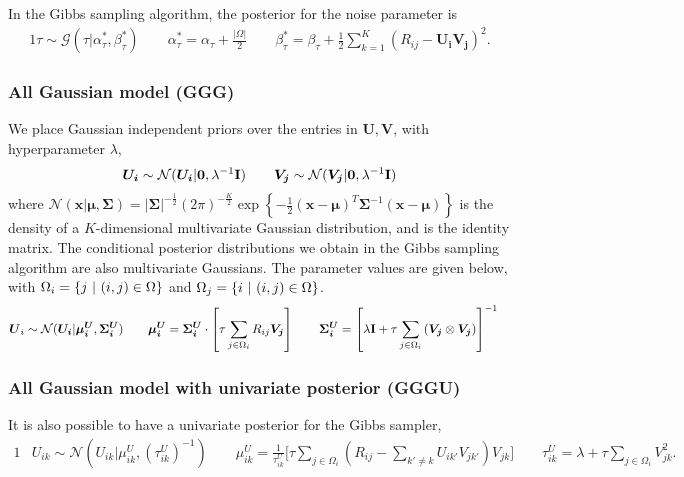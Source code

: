 \documentclass{article}
\newcommand{\U}{\boldsymbol U}
\newcommand{\Ui}{\boldsymbol{U_i}}
\newcommand{\V}{\boldsymbol V}
\newcommand{\Vj}{\boldsymbol{V_j}}
\newcommand{\SigmaUi}{\boldsymbol{\Sigma^U_i}}
\newcommand{\muUi}{\boldsymbol{\mu^U_i}}
\newcommand{\sumOmegai}{\sum_{j \in \Omega_i}}
\newcommand{\sumk}{\sum_{k=1}^K}
\newcommand{\sumexclk}{\sum_{k' \neq k}}
\newcommand{\diff}{( R_{ij} - \Ui \Vj ) }
\newcommand{\diffexclk}{( R_{ij} - \sumexclk U_{ik'} V_{jk'} ) }
\begin{document}
		In the Gibbs sampling algorithm, the posterior for the noise parameter is
		\begin{alignat*}{1}
			\tau \sim \mathcal{G} (\tau | \alpha^*_{\tau}, \beta^*_{\tau} )		\quad\quad 		\alpha^*_{\tau} = \alpha_{\tau} + \frac{\vert \Omega \vert}{2} 		\quad\quad  		\beta^*_{\tau} = \beta_{\tau} + \frac{1}{2} \sumk \diff^2.
		\end{alignat*}
		
		\subsubsection{All Gaussian model (GGG)}
		We place Gaussian independent priors over the entries in $\U,\V$, with hyperparameter $\lambda$,
		\begin{alignat*}{1}
			\Ui \sim \mathcal{N} ( \Ui | \boldsymbol 0, \lambda^{-1} \text{\textbf I} )		\quad\quad	\Vj \sim \mathcal{N} ( \Vj | \boldsymbol 0, \lambda^{-1} \text{\textbf I} )
		\end{alignat*}
		where $ \mathcal{N} (\boldsymbol x|\boldsymbol \mu,\boldsymbol \Sigma) = \vert \boldsymbol \Sigma \vert^{-\frac{1}{2}} (2\pi)^{-\frac{K}{2}} \exp \left\{ -\frac{1}{2} (\boldsymbol x - \boldsymbol \mu)^T \boldsymbol \Sigma^{-1} (\boldsymbol x - \boldsymbol \mu) \right\} $ is the density of a $K$-dimensional multivariate Gaussian distribution, and  is the identity matrix.
		The conditional posterior distributions we obtain in the Gibbs sampling algorithm are also multivariate Gaussians. The parameter values are given below, with $ \Omega_i = \left\{ j \text{ $ \vert $ } (i,j) \in \Omega \right\} $ and  $ \Omega_j = \left\{ i \text{ $ \vert $ } (i,j) \in \Omega \right\} $. 
		\begin{alignat*}{1}
			&\U_i \sim \mathcal{N} ( \Ui | \muUi, \SigmaUi )		
			\quad\quad	\muUi = \SigmaUi \cdot \left[ \tau \sumOmegai R_{ij} \Vj \right] 		
			\quad\quad	 \SigmaUi = \left[ \lambda \text{\textbf I} + \tau \sumOmegai \left( \Vj \otimes \Vj \right) \right]^{-1}
		\end{alignat*}
		
		\subsubsection{All Gaussian model with univariate posterior (GGGU)}
		It is also possible to have a univariate posterior for the Gibbs sampler,
		\begin{alignat*}{1}
			&U_{ik} \sim \mathcal{N} (U_{ik} | \mu^U_{ik}, (\tau^U_{ik})^{-1} )
			\quad\quad \mu^U_{ik} = \frac{1}{\tau^U_{ik}} \Bigg[ \tau \sumOmegai \diffexclk V_{jk} \Bigg] 
			\quad\quad \tau^U_{ik} = \lambda + \tau \sumOmegai V_{jk}^2.
		\end{alignat*}
		
\end{document}
